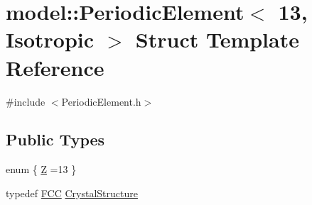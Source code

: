 \hypertarget{structmodel_1_1_periodic_element_3_0113_00_01_isotropic_01_4}{}\section{model\+:\+:Periodic\+Element$<$ 13, Isotropic $>$ Struct Template Reference}
\label{structmodel_1_1_periodic_element_3_0113_00_01_isotropic_01_4}


{\ttfamily \#include $<$Periodic\+Element.\+h$>$}

\subsection*{Public Types}
\begin{DoxyCompactItemize}
\item 
enum \{ \hyperlink{structmodel_1_1_periodic_element_3_0113_00_01_isotropic_01_4_a1905eb6e0d995acc788dc9f1bfb39578a81d019de2e178d7d546ca5e28c6bcd3b}{Z} =13
 \}
\item 
typedef \hyperlink{structmodel_1_1_f_c_c}{F\+C\+C} \hyperlink{structmodel_1_1_periodic_element_3_0113_00_01_isotropic_01_4_a7a251de8980c9b68bf122dc027406f5d}{Crystal\+Structure}
\end{DoxyCompactItemize}
